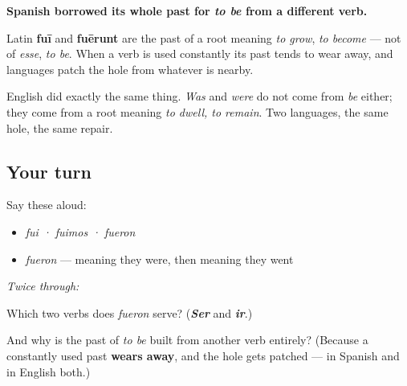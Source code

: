 \begin{cousinweb}
\textbf{Spanish borrowed its whole past for \emph{to be} from a different verb.}

Latin \textbf{fuī} and \textbf{fuērunt} are the past of a root meaning \emph{to grow}, \emph{to become} — not of \emph{esse}, \emph{to be}. When a verb is used constantly its past tends to wear away, and languages patch the hole from whatever is nearby.

English did exactly the same thing. \emph{Was} and \emph{were} do not come from \emph{be} either; they come from a root meaning \emph{to dwell, to remain}. Two languages, the same hole, the same repair.
\end{cousinweb}

\subsection*{Your turn}
Say these aloud:

\begin{itemize}
\raggedright
  \item \emph{fui · fuimos · fueron}
  \item \emph{fueron} — meaning they were, then meaning they went
\end{itemize}

\emph{Twice through:}

\begin{tcolorbox}[breakable,colback=teal!4,colframe=teal!35!black,title={Before you move on}]
Which two verbs does \emph{fueron} serve? (\emph{\textbf{Ser}} and \emph{\textbf{ir}}.)

And why is the past of \emph{to be} built from another verb entirely? (Because a constantly used past \textbf{wears away}, and the hole gets patched — in Spanish and in English both.)
\end{tcolorbox}

